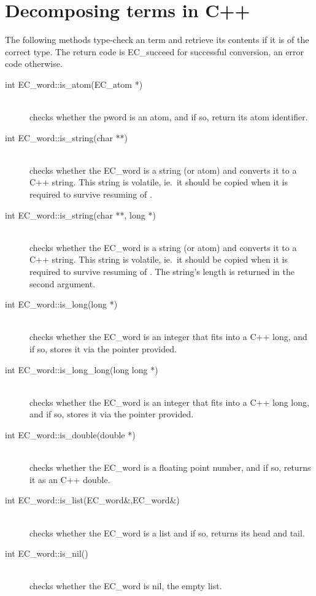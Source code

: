 \section{Decomposing {\eclipse} terms in C++}
The following methods type-check an {\eclipse} term and
retrieve its contents if it is of the correct type.
The return code is EC_succeed for successful conversion,
an error code otherwise.
\begin{description}
\item[int EC_word::is_atom(EC_atom *)]\ \\
	checks whether the {\eclipse} pword is an atom, and if so,
	return its atom identifier.

\item[int EC_word::is_string(char **)]\ \\
	checks whether the EC_word is a string (or atom) and converts
	it to a C++ string. This string is volatile, ie.\ it should be copied
	when it is required to survive resuming of {\eclipse}.

\item[int EC_word::is_string(char **, long *)]\ \\
	checks whether the EC_word is a string (or atom) and converts
	it to a C++ string. This string is volatile, ie.\ it should be copied
	when it is required to survive resuming of {\eclipse}.
	The string's length is returned in the second argument.

\item[int EC_word::is_long(long *)]\ \\
	checks whether the EC_word is an integer that fits into
	a C++ long, and if so, stores it via the pointer provided.

\item[int EC_word::is_long_long(long long *)]\ \\
	checks whether the EC_word is an integer that fits into
	a C++ long long, and if so, stores it via the pointer provided.

\item[int EC_word::is_double(double *)]\ \\
	checks whether the EC_word is a floating point number,
	and if so, returns it as an C++ double.

\item[int EC_word::is_list(EC_word\&,EC_word\&)]\ \\
	checks whether the EC_word is a list and if so, returns its head and tail.

\item[int EC_word::is_nil()]\ \\
	checks whether the EC_word is nil, the empty list.


\end{description}

